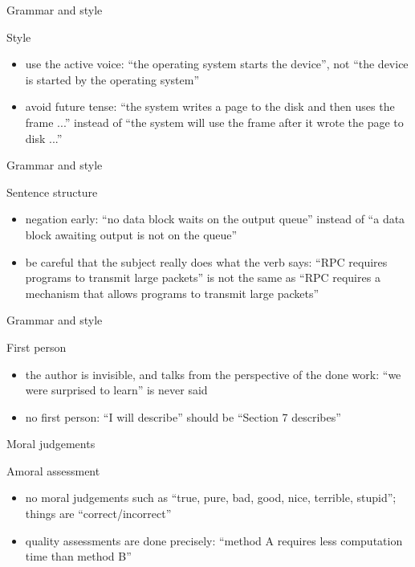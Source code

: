 \documentclass{beamer}
\begin{document}
\begin{frame}{Grammar and style}
\begin{block}{Style}
\begin{itemize}
\item use the active voice: ``the operating system starts the device'', not ``the device is started by the operating system''
\item avoid future tense: ``the system writes a page to the disk and then uses the frame ...'' instead of ``the system will use the frame after it wrote the page to disk ...''
\end{itemize}
\end{block}
\end{frame}

\begin{frame}{Grammar and style}
\begin{block}{Sentence structure}
\begin{itemize}
\item negation early: ``no data block waits on the output queue'' instead of ``a data block awaiting output is not on the queue''
\item be careful that the subject really does what the verb says: ``RPC requires programs to transmit large packets'' is not the same as ``RPC requires a mechanism that allows programs to transmit large packets''
\end{itemize}
\end{block}
\end{frame}

\begin{frame}{Grammar and style}
\begin{block}{First person}
\begin{itemize}
\item the author is invisible, and talks from the perspective of the done work: ``we were surprised to learn'' is never said
\item no first person: ``I will describe'' should be ``Section 7 describes''
\end{itemize}
\end{block}
\end{frame}

\begin{frame}{Moral judgements}
\begin{block}{Amoral assessment}
\begin{itemize}
\item no moral judgements such as ``true, pure, bad, good, nice, terrible, stupid''; things are ``correct/incorrect''
\item quality assessments are done precisely: ``method A requires less computation time than method B''
\end{itemize}
\end{block}
\end{frame}
\end{document}
